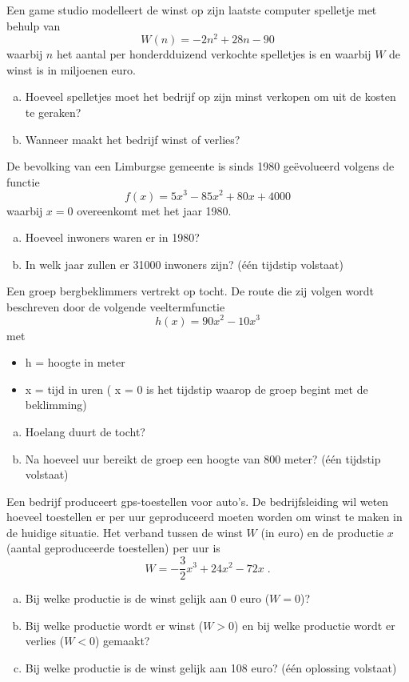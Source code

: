 \documentclass[12pt,twoside,a4paper]{article}
\begin{document}
\begin{oefening}
Een game studio modelleert de winst op zijn laatste computer spelletje met behulp van
$$W(n)=-2n^2+28n-90$$ waarbij $n$ het aantal per honderdduizend verkochte spelletjes is en waarbij $W$ de winst is in miljoenen euro.
\begin{enumerate}[(a)]
  \item Hoeveel spelletjes moet het bedrijf op zijn minst verkopen om uit de kosten te geraken?
  \item Wanneer maakt het bedrijf winst of verlies?
\end{enumerate}
\end{oefening}

\begin{oefening}
De bevolking van een Limburgse gemeente is sinds 1980 geëvolueerd volgens de functie $$f(x)=5x^3-85x^2+80x+4000$$ waarbij $x=0$ overeenkomt met het jaar 1980.
\begin{enumerate}[(a)]
  \item Hoeveel inwoners waren er in 1980?
  \item In welk jaar zullen er 31000 inwoners zijn? (één tijdstip volstaat)
\end{enumerate}
\end{oefening}

\begin{oefening}
Een groep bergbeklimmers vertrekt op tocht.  De route die zij volgen wordt beschreven	door de volgende veeltermfunctie $$h(x)=90x^2-10x^3$$ met
\begin{itemize}
  \item h = hoogte in meter
  \item x = tijd in uren ( x = 0 is het tijdstip waarop de groep begint met de beklimming)
\end{itemize}
\begin{enumerate}[(a)]
  \item Hoelang duurt de tocht?
  \item Na hoeveel uur bereikt de groep een hoogte van 800 meter? (één tijdstip volstaat)
\end{enumerate}
\end{oefening}

\begin{oefening}
Een bedrijf produceert gps-toestellen voor auto’s.  De bedrijfsleiding wil weten hoeveel toestellen er per uur geproduceerd moeten worden om winst te maken in de huidige situatie.  Het verband tussen de winst $W$ (in euro) en de productie $x$ (aantal geproduceerde toestellen) per uur is
$$W=-\dfrac{3}{2}x^3+24x^2-72x\;.$$
\begin{enumerate}[(a)]
  \item Bij welke productie is de winst gelijk aan 0 euro ($W = 0$)?
  \item Bij welke productie wordt er winst ($W > 0$) en bij welke productie wordt er verlies ($W < 0$) gemaakt?
  \item Bij welke productie is de winst gelijk aan 108 euro?  (één oplossing volstaat)
\end{enumerate}
\end{oefening}
\end{document}
